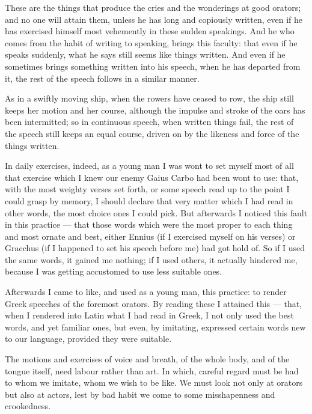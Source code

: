  These are the things that produce the cries and the wonderings at good orators; and no one will attain them, unless he has long and copiously written, even if he has exercised himself most vehemently in these sudden speakings. And he who comes from the habit of writing to speaking, brings this faculty: that even if he speaks suddenly, what he says still seems like things written. And even if he sometimes brings something written into his speech, when he has departed from it, the rest of the speech follows in a similar manner.

 As in a swiftly moving ship, when the rowers have ceased to row, the ship still keeps her motion and her course, although the impulse and stroke of the oars has been intermitted; so in continuous speech, when written things fail, the rest of the speech still keeps an equal course, driven on by the likeness and force of the things written.

 In daily exercises, indeed, as a young man I was wont to set myself most of all that exercise which I knew our enemy Gaius Carbo had been wont to use: that, with the most weighty verses set forth, or some speech read up to the point I could grasp by memory, I should declare that very matter which I had read in other words, the most choice ones I could pick. But afterwards I noticed this fault in this practice — that those words which were the most proper to each thing and most ornate and best, either Ennius (if I exercised myself on his verses) or Gracchus (if I happened to set his speech before me) had got hold of. So if I used the same words, it gained me nothing; if I used others, it actually hindered me, because I was getting accustomed to use less suitable ones.

 Afterwards I came to like, and used as a young man, this practice: to render Greek speeches of the foremost orators. By reading these I attained this — that, when I rendered into Latin what I had read in Greek, I not only used the best words, and yet familiar ones, but even, by imitating, expressed certain words new to our language, provided they were suitable.

 The motions and exercises of voice and breath, of the whole body, and of the tongue itself, need labour rather than art. In which, careful regard must be had to whom we imitate, whom we wish to be like. We must look not only at orators but also at actors, lest by bad habit we come to some misshapenness and crookedness.

